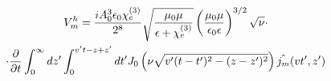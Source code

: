 %
%
%
%
%
%
\begin{equation} \begin{gathered} 
V_m^h = \frac{i A_0^3 \epsilon_0 \chi_e^{(3)}}{2^8}
\sqrt{\frac{\mu_0 \mu}{\epsilon + \chi_e^{(3)}}} 
\left( \frac{\mu_0 \mu}{\epsilon_0 \epsilon} \right)^{3/2} \sqrt{\nu} 
\cdot \\ \cdot \frac{\partial }{\partial t} \int_0^\infty dz' \int_0^{v't - z + z'} dt'
J_0 \left( \nu \sqrt{v'(t-t')^2 - (z-z')^2} \right) \hat{j_m} (vt',z')
\end{gathered} \end{equation}

